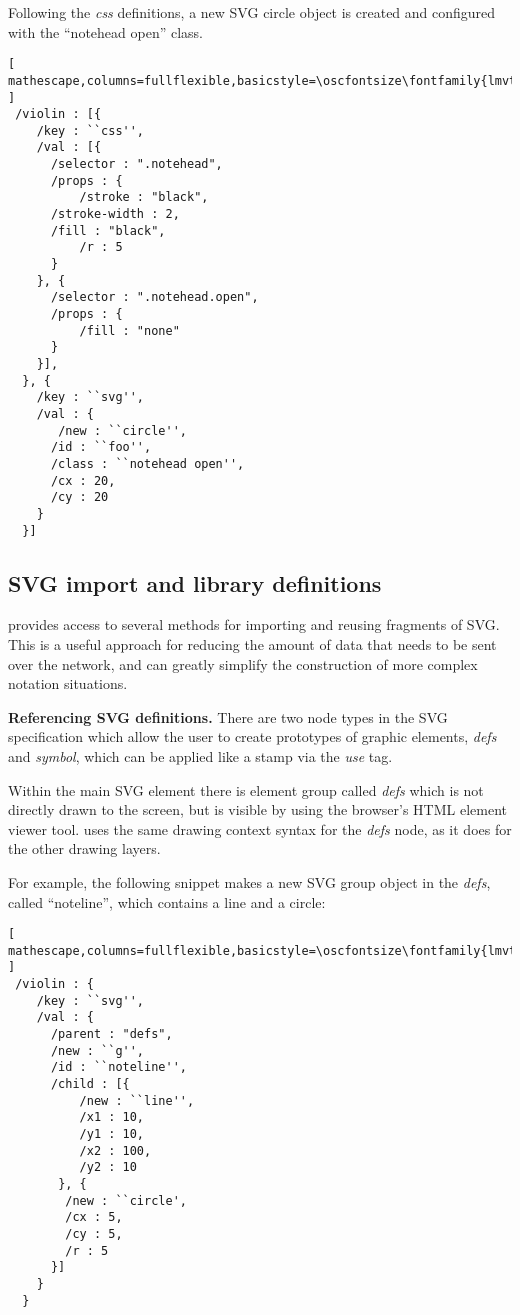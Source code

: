 Following the \textit{css} definitions, a new SVG circle object is created and configured with the ``notehead open'' class.

\begin{lstlisting}[ mathescape,columns=fullflexible,basicstyle=\oscfontsize\fontfamily{lmvtt}\selectfont ]
 /violin : [{
    /key : ``css'',
    /val : [{
      /selector : ".notehead",
      /props : {
          /stroke : "black",
	  /stroke-width : 2,
	  /fill : "black",
          /r : 5
      }
    }, {
      /selector : ".notehead.open",
      /props : {
          /fill : "none"
      }
    }],
  }, {
    /key : ``svg'',
    /val : {
       /new : ``circle'',
      /id : ``foo'',
      /class : ``notehead open'',
      /cx : 20,
      /cy : 20
    }
  }]

 \end{lstlisting}


\subsection{SVG import and library definitions}\label{sec:defs}
\drawsocket provides access to several methods for importing and reusing fragments of SVG.
This is a useful approach for reducing the amount of data that needs to be sent over the network, and can greatly simplify the construction of more complex notation situations.

\medskip
\noindent
\textbf{Referencing SVG definitions.} 
There are two node types in the SVG specification which allow the user to create prototypes of graphic elements, \textit{defs} and \textit{symbol}, which can be applied like a stamp via the \textit{use} tag. 

Within the \drawsocket main SVG element there is element group called \textit{defs} which is not directly drawn to the screen, but is visible by using the browser's HTML element viewer tool.
\drawsocket uses the same drawing context syntax for the \textit{defs} node, as it does for the other drawing layers.

For example, the following snippet makes a new SVG group object in the \textit{defs}, called ``noteline'', which contains a line and a circle:

\begin{minipage}{\linewidth}
\begin{lstlisting}[ mathescape,columns=fullflexible,basicstyle=\oscfontsize\fontfamily{lmvtt}\selectfont ]
 /violin : {
    /key : ``svg'',
    /val : {
      /parent : "defs",
      /new : ``g'',
      /id : ``noteline'',
      /child : [{
          /new : ``line'',
          /x1 : 10,
          /y1 : 10,
          /x2 : 100,
          /y2 : 10
       }, {
        /new : ``circle',
        /cx : 5,
        /cy : 5,
        /r : 5
      }]
    } 
  }
 \end{lstlisting}
 \end{minipage}


